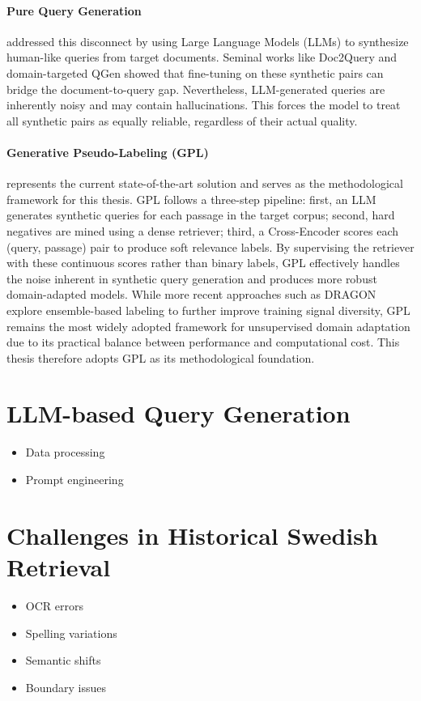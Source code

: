 \documentclass[thesis]{cluu}
\begin{document}
\paragraph{\textbf{Pure Query Generation}} addressed this disconnect by using 
Large Language Models (LLMs) to synthesize human-like queries from 
target documents. Seminal works like Doc2Query 
\parencite{nogueira2019doc2query} and domain-targeted QGen 
\parencite{ma-etal-2021-zero} showed that fine-tuning on these 
synthetic pairs can bridge the document-to-query gap. Nevertheless, 
LLM-generated queries are inherently noisy and may contain 
hallucinations. This forces the model to treat all synthetic pairs 
as equally reliable, regardless of their actual quality.

\paragraph{\textbf{Generative Pseudo-Labeling (GPL)}} 
\parencite{wang-etal-2022-gpl} represents the current state-of-the-art 
solution and serves as the methodological framework for this thesis. 
GPL follows a three-step pipeline: first, an LLM generates synthetic 
queries for each passage in the target corpus; second, hard negatives 
are mined using a dense retriever; third, a Cross-Encoder scores each 
(query, passage) pair to produce soft relevance labels. By supervising 
the retriever with these continuous scores rather than binary labels, 
GPL effectively handles the noise inherent in synthetic query 
generation and produces more robust domain-adapted models. While more 
recent approaches such as DRAGON \parencite{lin-etal-2023-train} 
explore ensemble-based labeling to further improve training signal 
diversity, GPL remains the most widely adopted framework for 
unsupervised domain adaptation due to its practical balance between 
performance and computational cost. This thesis therefore adopts GPL 
as its methodological foundation.

\section{LLM-based Query Generation}
\begin{itemize}
  \item Data processing
  \item Prompt engineering
\end{itemize}

\section{Challenges in Historical Swedish Retrieval}
\begin{itemize}
  \item OCR errors
  \item Spelling variations
  \item Semantic shifts
  \item Boundary issues
\end{itemize}


\printbibliography
\end{document}
